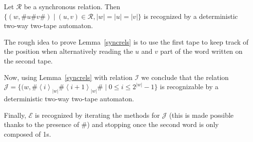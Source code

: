 \documentclass[runningheads, envcountsame, a4paper]{llncs}
\newcommand*{\srel}{\mathcal{R}}
\newcommand*{\base}[3][]{\left\langle {#3} \right\rangle_{#1}}
\newcommand*{\size}[1]{\left| #1 \right|}
\newcommand*{\dmodel}{deterministic two-way two-tape automaton\xspace}
\newcommand*{\enum}{\mathcal{E}}
\newcommand*{\incrementS}{\mathcal{I}}
\newcommand*{\increment}{\mathcal{J}}
\begin{document}
  
\begin{lemma} \label{syncrels}  
  Let $\srel$ be a synchronous relation. Then $\{(w, \# u\# v\#) \mid (u,
  v) \in \srel, \size{w} = \size{u} = \size{v} \}$ is recognized by a
  \dmodel.
\end{lemma}

The rough idea to prove Lemma~\ref{syncrels} is to use the first tape to
keep track of the position when alternatively reading the $u$ and $v$ part
of the word written on the second tape. 
        
Now, using Lemma~\ref{syncrels} with relation $\incrementS$ we conclude
that the relation $\increment = \{ (w,
\#\base[\size{w}]{2}{i}\#\base[\size{w}]{2}{i+1}\# \mid 0 \leq i \leq
2^{\size{w}} - 1 \}$ is recognizable by a \dmodel.

Finally, $\enum$ is recognized by iterating the methods for $\increment$ 
(this is made possible thanks to the presence of $\#$) and stopping once
the second word is only composed of 1s.


 
\end{document}
